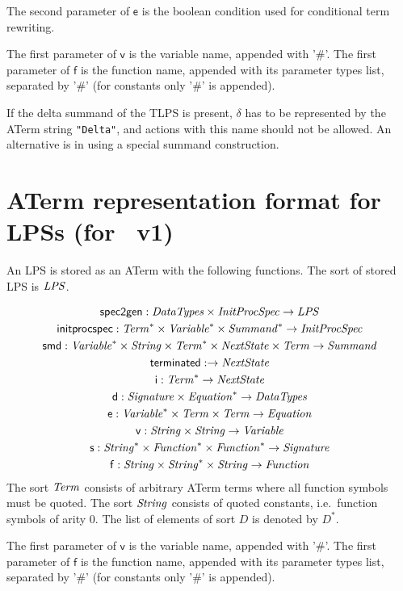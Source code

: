 \documentclass[fleqn,a4paper,dvips]{article}
\newcommand{\aterm}[1]{\mathsf{#1}}
\newcommand{\afunc}[3]{\aterm{#1}:#2\rightarrow#3}
\begin{document}
The second parameter of $\mathsf{e}$ is the boolean condition used for
conditional term rewriting.

The first parameter of $\mathsf{v}$ is the variable name, appended with '\#'.
The first parameter of $\mathsf{f}$ is the function name, appended 
with its parameter types list, separated by '\#' (for constants only '\#' is appended).

If the delta summand of the TLPS is present, $\delta$ has to be
represented by the ATerm string \texttt{"Delta"}, and actions with
this name should not be allowed.  An alternative is in using a special
summand construction.

\newpage
\section{ATerm representation format for LPSs (for \mcrl\ v1)}
An LPS is stored as an ATerm with the following functions. The sort
of stored LPS is $\mathit{LPS}$.

\begin{gather*}
\afunc{spec2gen}{\nm{DataTypes}\x\nm{InitProcSpec}}{\nm{LPS}}\\
\afunc{initprocspec}{\nm{Term}^*\x\nm{Variable}^*\x\nm{Summand}^*}{\nm{InitProcSpec}}\\
\afunc{smd}{\nm{Variable}^*\x\nm{String}\x\nm{Term}^*\x\nm{NextState}\x\nm{Term}}{\nm{Summand}}\\
\afunc{terminated}{}{\nm{NextState}}\\
\afunc{i}{\nm{Term}^*}{\nm{NextState}}\\
\afunc{d}{\nm{Signature}\x\nm{Equation}^*}{\nm{DataTypes}}\\
\afunc{e}{\nm{Variable}^*\x\nm{Term}\x\nm{Term}}{\nm{Equation}}\\
\afunc{v}{\nm{String}\x\nm{String}}{\nm{Variable}}\\
\afunc{s}{\nm{String}^*\x\nm{Function}^*\x\nm{Function}^*}{\nm{Signature}}\\
\afunc{f}{\nm{String}\x\nm{String}^{*}\x\nm{String}}{\nm{Function}}
\end{gather*}
The sort $\mathit{Term}$ consists of arbitrary ATerm terms where all function
symbols must be quoted. The sort $\mathit{String}$ consists of quoted constants,
i.e.\ function symbols of arity 0. The list
of elements of sort $D$ is denoted by $D^{*}$.

The first parameter of $\mathsf{v}$ is the variable name, appended with '\#'.
The first parameter of $\mathsf{f}$ is the function name, appended 
with its parameter types list, separated by '\#' (for constants only '\#' is appended).
\end{document}
